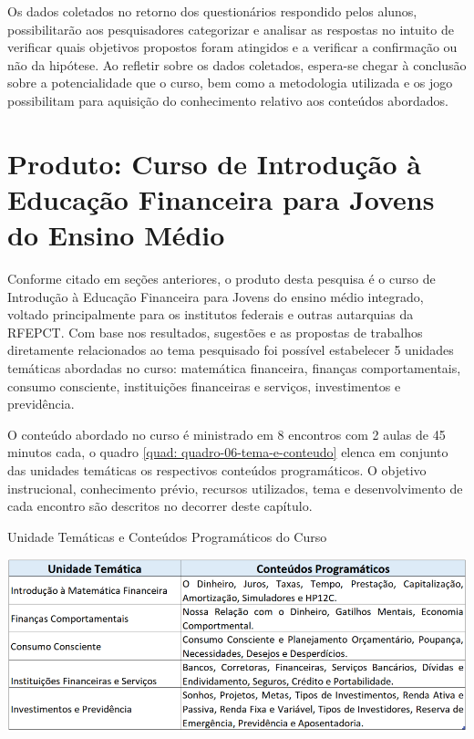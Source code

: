 Os dados coletados no retorno dos questionários respondido pelos alunos, possibilitarão aos pesquisadores categorizar e analisar as respostas no intuito de verificar quais objetivos propostos foram atingidos e a verificar a confirmação ou não da hipótese. Ao refletir sobre os dados coletados, espera-se chegar à conclusão sobre a potencialidade que o curso, bem como a metodologia utilizada e os jogo possibilitam para aquisição do conhecimento relativo aos conteúdos abordados.

\chapter{Produto: Curso de Introdução à Educação Financeira para Jovens do Ensino Médio}
Conforme citado em seções anteriores, o produto desta pesquisa é o curso de Introdução à Educação Financeira para Jovens do ensino médio integrado, voltado principalmente para os institutos federais e outras autarquias da RFEPCT. Com base nos resultados, sugestões e as propostas de trabalhos diretamente relacionados ao tema pesquisado foi possível estabelecer 5 unidades temáticas abordadas no curso: matemática financeira, finanças comportamentais, consumo consciente, instituições financeiras e serviços, investimentos e previdência.

O conteúdo abordado no curso é ministrado em 8 encontros com 2 aulas de 45 minutos cada, o quadro \ref{quad: quadro-06-tema-e-conteudo} elenca em conjunto das unidades temáticas os respectivos conteúdos programáticos. O objetivo instrucional, conhecimento prévio, recursos utilizados, tema e desenvolvimento de cada encontro são descritos no decorrer deste capítulo.

\graphicspath{{quadros/}} 
\begin{quadro}[!ht]
\centering
\begin{minipage}{1.\textwidth}
\caption{Unidade Temáticas e Conteúdos Programáticos do Curso}
\centering
\includegraphics[width=1.0\textwidth]{quadro-06-tema-e-conteudo.png}
\label{quad: quadro-06-tema-e-conteudo}
\end{minipage}
\end{quadro}

